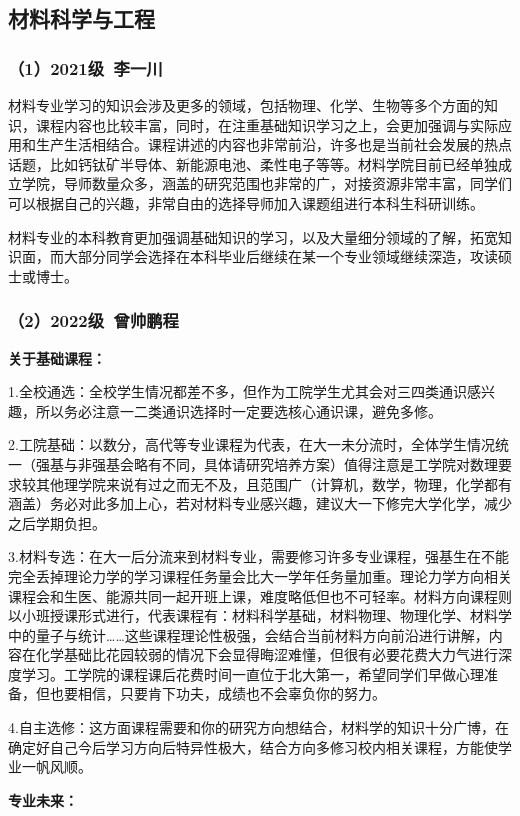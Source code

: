 \documentclass[11pt,oneside]{book}
\begin{document}
        
\subsection{材料科学与工程}
\subsubsection{（1）2021级\ 李一川}
材料专业学习的知识会涉及更多的领域，包括物理、化学、生物等多个方面的知识，课程内容也比较丰富，同时，在注重基础知识学习之上，会更加强调与实际应用和生产生活相结合。课程讲述的内容也非常前沿，许多也是当前社会发展的热点话题，比如钙钛矿半导体、新能源电池、柔性电子等等。材料学院目前已经单独成立学院，导师数量众多，涵盖的研究范围也非常的广，对接资源非常丰富，同学们可以根据自己的兴趣，非常自由的选择导师加入课题组进行本科生科研训练。

材料专业的本科教育更加强调基础知识的学习，以及大量细分领域的了解，拓宽知识面，而大部分同学会选择在本科毕业后继续在某一个专业领域继续深造，攻读硕士或博士。
\subsubsection{（2）2022级\ 曾帅鹏程}
\textbf{关于基础课程：}

1.全校通选：全校学生情况都差不多，但作为工院学生尤其会对三四类通识感兴趣，所以务必注意一二类通识选择时一定要选核心通识课，避免多修。

2.工院基础：以数分，高代等专业课程为代表，在大一未分流时，全体学生情况统一（强基与非强基会略有不同，具体请研究培养方案）值得注意是工学院对数理要求较其他理学院来说有过之而无不及，且范围广（计算机，数学，物理，化学都有涵盖）务必对此多加上心，若对材料专业感兴趣，建议大一下修完大学化学，减少之后学期负担。

3.材料专选：在大一后分流来到材料专业，需要修习许多专业课程，强基生在不能完全丢掉理论力学的学习课程任务量会比大一学年任务量加重。理论力学方向相关课程会和生医、能源共同一起开班上课，难度略低但也不可轻率。材料方向课程则以小班授课形式进行，代表课程有：材料科学基础，材料物理、物理化学、材料学中的量子与统计……这些课程理论性极强，会结合当前材料方向前沿进行讲解，内容在化学基础比花园较弱的情况下会显得晦涩难懂，但很有必要花费大力气进行深度学习。工学院的课程课后花费时间一直位于北大第一，希望同学们早做心理准备，但也要相信，只要肯下功夫，成绩也不会辜负你的努力。

4.自主选修：这方面课程需要和你的研究方向想结合，材料学的知识十分广博，在确定好自己今后学习方向后特异性极大，结合方向多修习校内相关课程，方能使学业一帆风顺。

\textbf{专业未来：}
\end{document}
